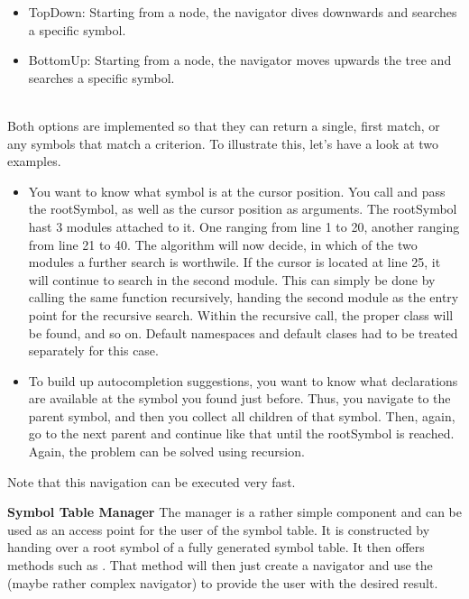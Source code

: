 \begin{itemize}
\item TopDown: Starting from a node, the navigator dives downwards and searches a specific symbol.
\item BottomUp: Starting from a node, the navigator moves upwards the tree and searches a specific symbol.
\end{itemize}

 \\

Both options are implemented so that they can return a single, first match, or any symbols that match a criterion. To illustrate this, let's have a look at two examples.
\begin{itemize}
    \item You want to know what symbol is at the cursor position. You call  and pass the rootSymbol, as well as the cursor position as arguments. The rootSymbol hast 3 modules attached to it. One ranging from line 1 to 20, another ranging from line 21 to 40. The algorithm will now decide, in which of the two modules a further search is worthwile. If the cursor is located at line 25, it will continue to search in the second module. This can simply be done by calling the same function recursively, handing the second module as the entry point for the recursive search. Within the recursive call, the proper class will be found, and so on. Default namespaces and default clases had to be treated separately for this case.
    \item To build up autocompletion suggestions, you want to know what declarations are available at the symbol you found just before. Thus, you navigate to the parent symbol, and then you collect all children of that symbol. Then, again, go to the next parent and continue like that until the rootSymbol is reached. Again, the problem can be solved using recursion.
\end{itemize}
Note that this navigation can be executed very fast.

\textbf{Symbol Table Manager}
The manager is a rather simple component and can be used as an access point for the user of the symbol table. It is constructed by handing over a root symbol of a fully generated symbol table. It then offers methods such as . That method will then just create a navigator and use the (maybe rather complex navigator) to provide the user with the desired result. 



